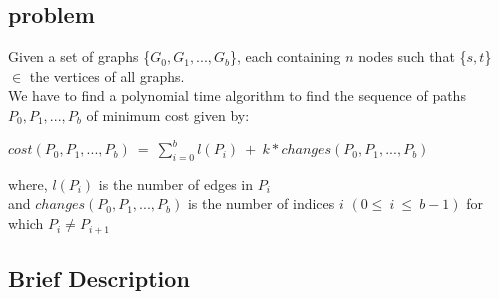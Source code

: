 \documentclass[pdftex,a4paper,12pt]{report}
\begin{document}
\subsection{problem}
Given a set of graphs \{$G_0,G_1,...,G_b$\}, each containing $n$ nodes such that \{$s,t$\} $\in$ the vertices of all graphs.\\
We have to find a polynomial time algorithm to find the sequence of paths $P_0,P_1,...,P_b$ of minimum cost given by:
\begin{center}
$cost(P_0,P_1,...,P_b)\ =\  \sum_{i=0}^{b}l(P_i)\ +\ k*changes(P_0,P_1,...,P_b) $
\end{center}
where, $l(P_i)$ is the number of edges in $P_i$\\
and $changes(P_0,P_1,...,P_b)$ is the number of indices $i$ $(0\leq\ i\ \leq\ b-1)$ for which $P_i \neq P_{i+1}$ 
\subsection{Brief Description}
\end{document}

